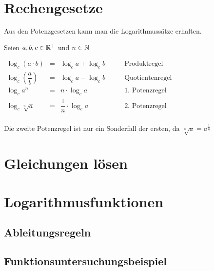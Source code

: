 \documentclass[../MAIN/main.tex]{subfiles}
\begin{document}
			\section{Rechengesetze}

Aus den Potenzgesetzen kann man die Logarithmussätze erhalten.

\begin{Theorem}
Seien $a,b,c\in\mathbb{R}^+$ und $n\in\mathbb{N}$\\
\begin{center}
$\begin{array}{cccl}
\log_c(a\cdot b)&=&\log_ca+\log_cb&\qquad\mbox {Produktregel}\\
\log_c\left(\dfrac{a}{b}\right)&=&\log_ca-\log_cb&\qquad\mbox{Quotientenregel}\\
\log_ca^n&=&n\cdot\log_ca&\qquad\mbox{1. Potenzregel}\\
\log_c\sqrt[n]{a}&=&\dfrac{1}{n}\cdot\log_ca&\qquad\mbox{2. Potenzregel}\\
\end{array}$
\end{center}
\end{Theorem}

\begin{Bemerkung}
Die zweite Potenzregel ist nur ein Sonderfall der ersten, da $\sqrt[n]{a}=a^{\frac{1}{n}}$
\end{Bemerkung}

		\section{Gleichungen lösen}


		\section{Logarithmusfunktionen}

	\subsection{Ableitungsregeln}
	\subsection{Funktionsuntersuchungsbeispiel}
\end{document}
